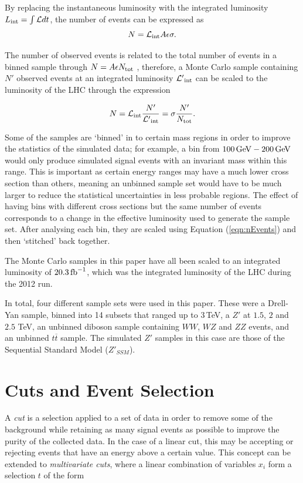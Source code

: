 \documentclass{article}
\begin{document}
By replacing the instantaneous luminosity with the integrated luminosity ${L}_{\rm{int}} = \int \mathcal{L}dt$, the number of events can be expressed as
\begin{equation}
N= \mathcal{L}_{\rm{int}}A\epsilon\sigma.
\end{equation}

The number of observed events is related to the total number of events in a binned sample through $N = A\epsilon N_{\rm{tot}}$ , therefore, a Monte Carlo sample containing $N'$ observed events at an integrated luminosity $\mathcal{L'}_{\rm{int}}$ can be scaled to the luminosity of the LHC through the expression

\begin{equation}
N = \mathcal{L}_{\rm{int}}\frac{N'}{\mathcal{L'}_{\rm{int}}} = \sigma\frac{N'}{N_{\rm{tot}}}.
\label{eqn:nEvents}
\end{equation}

Some of the samples are `binned' in to certain mass regions in order to improve the statistics of the simulated data; for example, a bin from $100\,\rm{GeV}-200\,\rm{GeV}$ would only produce simulated signal events with an invariant mass within this range. This is important as certain energy ranges may have a much lower cross section than others, meaning an unbinned sample set would have to be much larger to reduce the statistical uncertainties in less probable regions. The effect of having bins with different cross sections but the same number of events corresponds to a change in the effective luminosity used to generate the sample set. After analysing each bin, they are scaled using Equation (\ref{eqn:nEvents}) and then `stitched' back together.

The Monte Carlo samples in this paper have all been scaled to an integrated luminosity of $20.3\,\rm{fb}^{-1}$, which was the integrated luminosity of the LHC during the 2012 run.

In total, four different sample sets were used in this paper. These were a Drell-Yan sample, binned into 14 subsets that ranged up to $3\,$TeV, a $Z'$ at $1.5$, $2$ and $2.5$ TeV, an unbinned diboson sample containing $WW$, $WZ$ and $ZZ$ events, and an unbinned $t\overline{t}$ sample. The simulated $Z'$ samples in this case are those of the Sequential Standard Model ($Z'_{SSM}$).


\section{Cuts and Event Selection}
\label{sec:cuts}
A \textit{cut} is a selection applied to a set of data in order to remove some of the background while retaining as many signal events as possible to improve the purity of the collected data. In the case of a linear cut, this may be accepting or rejecting events that have an energy above a certain value. This concept can be extended to \textit{multivariate cuts}, where a linear combination of variables $x_i$ form a selection $t$ of the form
\end{document}
